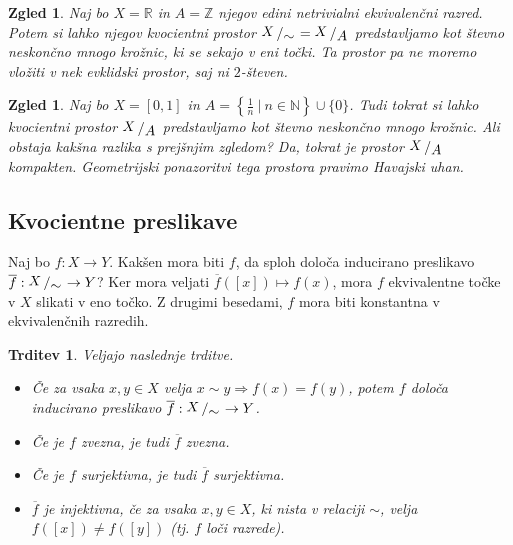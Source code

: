 \documentclass[10pt, a4paper]{article}
\newtheorem{trditev}[izr]{Trditev}
\newtheorem{zgled}[izr]{Zgled}
\newcommand{\N}{\mathbb {N}}
\newcommand{\Z}{\mathbb {Z}}
\newcommand{\R}{\mathbb {R}}
\newcommand{\quot}[2]{{\raisebox{0.1em}{$#1$}\left/\raisebox{-0.2em}{$#2$}\right.}}
\begin{document}
\begin{zgled}
    Naj bo $X = \R$ in $A = \Z$ njegov edini netrivialni ekvivalenčni razred.
    Potem si lahko njegov kvocientni prostor $\quot{X}{\sim} = \quot{X}{A}$ predstavljamo
    kot števno neskončno mnogo krožnic, ki se sekajo v eni točki. 
    Ta prostor pa ne moremo vložiti v nek evklidski prostor, saj ni $2$-števen.
\end{zgled}

\begin{zgled}
    Naj bo $X = [0, 1]$ in $A = \left\lbrace \frac{1}{n}\ \Big|\ n \in \N \right\rbrace \cup \{0\}$.
    Tudi tokrat si lahko kvocientni prostor $\quot{X}{A}$ predstavljamo kot 
    števno neskončno mnogo krožnic. Ali obstaja kakšna razlika s prejšnjim zgledom?
    Da, tokrat je prostor $\quot{X}{A}$ kompakten.
    Geometrijski ponazoritvi tega prostora pravimo Havajski uhan.
    \begin{center}
    \end{center}
\end{zgled}

\subsection{Kvocientne preslikave}

Naj bo $f: X \to Y$. Kakšen mora biti $f$, da sploh določa inducirano preslikavo 
$\overline{f}: \quot{X}{\sim} \to Y$? Ker mora veljati $\overline{f}([x]) \mapsto f(x)$,
mora $f$ ekvivalentne točke v $X$ slikati v eno točko. Z drugimi besedami, $f$ mora biti konstantna v ekvivalenčnih razredih.

\begin{trditev}
    Veljajo naslednje trditve.
    \begin{itemize}
        \item Če za vsaka $x, y \in X$ velja $x \sim y \Rightarrow f(x) = f(y)$,
        potem $f$ določa inducirano preslikavo $\overline{f}: \quot{X}{\sim} \to Y$.
        \item Če je $f$ zvezna, je tudi $\overline{f}$ zvezna.
        \item Če je $f$ surjektivna, je tudi $\overline{f}$ surjektivna.
        \item $\overline{f}$ je injektivna, če za vsaka $x, y \in X$, ki nista v relaciji $\sim$, velja $f([x]) \neq f([y])$
        (tj. $f$ loči razrede).
    \end{itemize}
\end{trditev}
\end{document}
